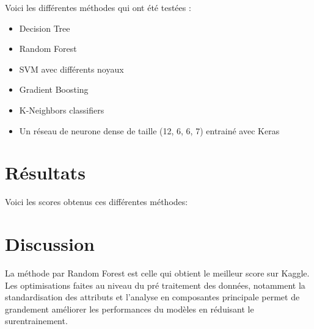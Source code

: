 \documentclass[12pt]{article}
\begin{document}
Voici les différentes méthodes qui ont été testées :

\begin{itemize}
	\item Decision Tree
	\item Random Forest
	\item SVM avec différents noyaux
	\item Gradient Boosting
	\item K-Neighbors classifiers
	\item Un réseau de neurone dense de taille (12, 6, 6, 7) entrainé avec Keras
	
\end{itemize}


\section*{Résultats}

Voici les scores obtenus ces différentes méthodes:


\section*{Discussion}

La méthode par Random Forest est celle qui obtient le meilleur score sur Kaggle. Les optimisations faites au niveau du pré traitement des données, notamment la standardisation des attributs et l'analyse en composantes principale permet de grandement améliorer les performances du modèles en réduisant le surentrainement.

\end{document}
